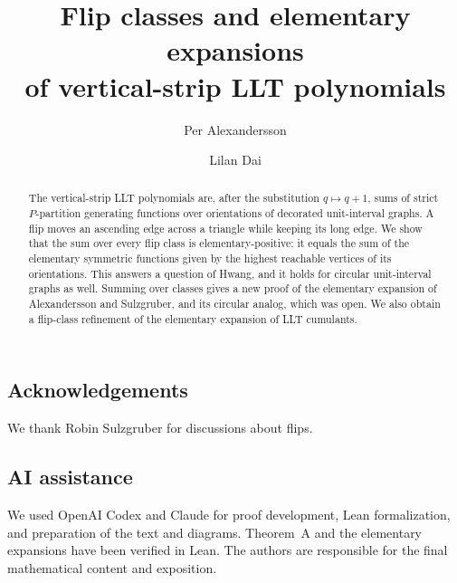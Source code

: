 \documentclass[reqno]{amsart}
\title[Flip classes of vertical-strip LLT polynomials]{%
Flip classes and elementary expansions\\
of vertical-strip LLT polynomials}
\author{Per Alexandersson}
\author{Lilan Dai}
\theoremstyle{definition}
\begin{document}
\begin{abstract}
The vertical-strip LLT polynomials are, after the substitution $q\mapsto q+1$,
sums of strict $P$-partition generating functions over orientations of
decorated unit-interval graphs.
A flip moves an ascending edge across a triangle while keeping its long edge.
We show that the sum over every flip class is elementary-positive: it equals the
sum of the elementary symmetric functions given by the highest reachable
vertices of its orientations.
This answers a question of Hwang, and it holds for circular unit-interval graphs
as well.
Summing over classes gives a new proof of the elementary expansion of
Alexandersson and Sulzgruber, and its circular analog, which was open.
We also obtain a flip-class refinement of the elementary expansion of
LLT cumulants.
\end{abstract}

\maketitle

\setcounter{tocdepth}{1}
\tableofcontents









\subsection*{Acknowledgements}
We thank Robin Sulzgruber for discussions about flips.

\subsection*{AI assistance}
We used OpenAI Codex and Claude for proof development, Lean formalization, and
preparation of the text and diagrams.
Theorem~A and the elementary expansions have been verified in Lean.
The authors are responsible for the final mathematical content and exposition.



\end{document}
